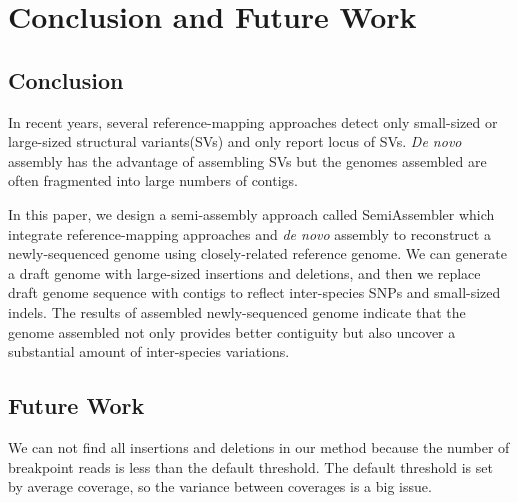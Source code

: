 \graphicspath{ {Chapters/images/} }
\chapter{Conclusion and Future Work}
\section{Conclusion}
In recent years, several reference-mapping approaches detect only small-sized or large-sized structural variants(SVs) and only report locus of SVs. {\em De novo} assembly has the advantage of assembling SVs but the genomes assembled are often fragmented into large numbers of contigs.

In this paper, we design a semi-assembly approach called SemiAssembler which integrate reference-mapping approaches and {\em de novo} assembly to reconstruct a newly-sequenced genome using closely-related reference genome. We can generate a draft genome with large-sized insertions and deletions, and then we replace draft genome sequence with contigs to reflect inter-species SNPs and small-sized indels. The results of assembled newly-sequenced genome indicate that the genome assembled not only provides better contiguity but also uncover a substantial amount of inter-species variations.

\section{Future Work}
We can not find all insertions and deletions in our method because the number of breakpoint reads is less than the default threshold. The default threshold is set by average coverage, so the variance between coverages is a big issue.
